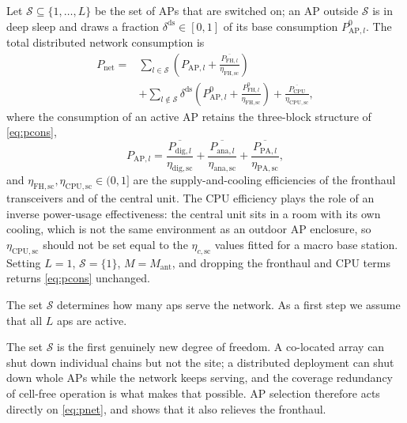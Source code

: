 Let $\mathcal{S}\subseteq\{1,\dots,L\}$ be the set of APs that are switched on;
an AP outside $\mathcal{S}$ is in deep sleep and draws a fraction
$\delta^{\mathrm{ds}}\in[0,1]$ of its base consumption
$P^{0}_{\mathrm{AP},l}$. The total distributed network consumption is
\begin{align}
\label{eq:pnet}
P_{\mathrm{net}} ={}& \sum_{l\in\mathcal{S}}
\left(P_{\mathrm{AP},l} + \frac{\overline{P_{\mathrm{FH},l}}}{\eta_{\mathrm{FH,sc}}}\right)
\nonumber\\
&+ \sum_{l\notin\mathcal{S}} \delta^{\mathrm{ds}}
\left(P^{0}_{\mathrm{AP},l} + \frac{P^{0}_{\mathrm{FH},l}}{\eta_{\mathrm{FH,sc}}}\right)
+ \frac{\overline{P_{\mathrm{CPU}}}}{\eta_{\mathrm{CPU,sc}}},
\end{align}
where the consumption of an active AP retains the three-block structure of
\eqref{eq:pcons},
\begin{equation}
\label{eq:pap}
P_{\mathrm{AP},l} =
\frac{\overline{P_{\mathrm{dig},l}}}{\eta_{\mathrm{dig,sc}}}
+ \frac{\overline{P_{\mathrm{ana},l}}}{\eta_{\mathrm{ana,sc}}}
+ \frac{\overline{P_{\mathrm{PA},l}}}{\eta_{\mathrm{PA,sc}}},
\end{equation}
and $\eta_{\mathrm{FH,sc}},\eta_{\mathrm{CPU,sc}}\in(0,1]$ are the
supply-and-cooling efficiencies of the fronthaul transceivers and of the central
unit. The CPU efficiency plays the role of an inverse power-usage effectiveness:
the central unit sits in a room with its own cooling, which is not the same
environment as an outdoor AP enclosure, so $\eta_{\mathrm{CPU,sc}}$ should not be
set equal to the $\eta_{c,\mathrm{sc}}$ values fitted for a macro base station. 
Setting $L=1$, $\mathcal{S}=\{1\}$, $M=M_{\mathrm{ant}}$, and dropping the
fronthaul and CPU terms returns \eqref{eq:pcons} unchanged.

The set $\mathcal{S}$ determines how many \glspl{ap} serve the network. As a first step we assume that all $L$ \glspl{ap} are active. 

The set $\mathcal{S}$ is the first genuinely new degree of freedom. A co-located
array can shut down individual chains but not the site; a distributed deployment
can shut down whole APs while the network keeps serving, and the coverage
redundancy of cell-free operation is what makes that possible. AP selection
therefore acts directly on \eqref{eq:pnet}, and  shows that
it also relieves the fronthaul.

